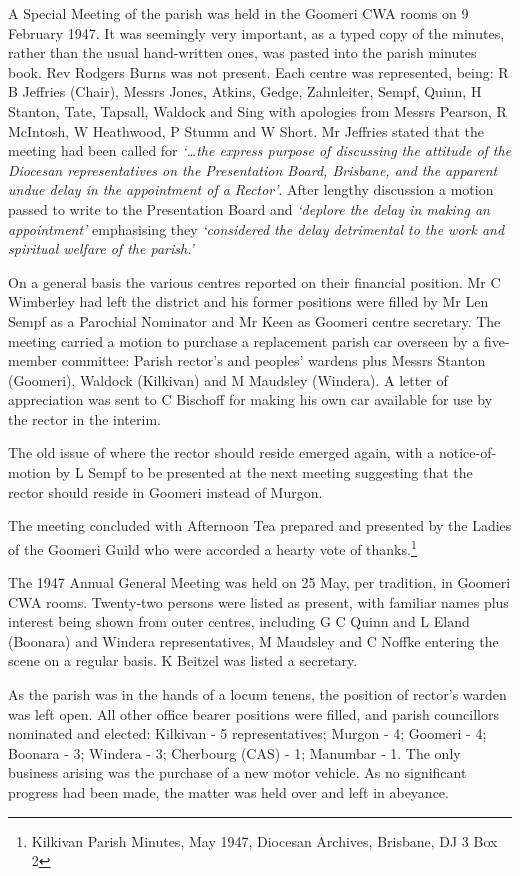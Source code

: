 A Special Meeting of the parish was held in the Goomeri CWA rooms on 9 February 1947. It was seemingly very important, as a typed copy of the minutes, rather than the usual hand-written ones, was pasted into the parish minutes book. Rev Rodgers Burns was not present. Each centre was represented, being: R B Jeffries (Chair), Messrs Jones, Atkins, Gedge, Zahnleiter, Sempf, Quinn, H Stanton, Tate, Tapsall, Waldock and Sing with apologies from Messrs Pearson, R McIntosh, W Heathwood, P Stumm and W Short. Mr Jeffries stated that the meeting had been called for \emph{`\ldots the express purpose of discussing the attitude of the Diocesan representatives on the Presentation Board, Brisbane, and the apparent undue delay in the appointment of a Rector'}. After lengthy discussion a motion passed to write to the Presentation Board and \emph{`deplore the delay in making an appointment'} emphasising they \emph{`considered the delay detrimental to the work and spiritual welfare of the parish.'}

On a general basis the various centres reported on their financial position. Mr C Wimberley had left the district and his former positions were filled by Mr Len Sempf as a Parochial Nominator and Mr Keen as Goomeri centre secretary. The meeting carried a motion to purchase a replacement parish car overseen by a five-member committee: Parish rector's and peoples' wardens plus Messrs Stanton (Goomeri), Waldock (Kilkivan) and M Maudsley (Windera). A letter of appreciation was sent to C Bischoff for making his own car available for use by the rector in the interim.

The old issue of where the rector should reside emerged again, with a notice-of-motion by L Sempf to be presented at the next meeting suggesting that the rector should reside in Goomeri instead of Murgon.

The meeting concluded with Afternoon Tea prepared and presented by the Ladies of the Goomeri Guild who were accorded a hearty vote of thanks.\footnote{Kilkivan Parish Minutes, May 1947, Diocesan Archives, Brisbane, DJ 3 Box 2}

The 1947 Annual General Meeting was held on 25 May, per tradition, in Goomeri CWA rooms. Twenty-two persons were listed as present, with familiar names plus interest being shown from outer centres, including G C Quinn and L Eland (Boonara) and Windera representatives, M Maudsley and C Noffke entering the scene on a regular basis. K Beitzel was listed a secretary.

As the parish was in the hands of a locum tenens, the position of rector's warden was left open. All other office bearer positions were filled, and parish councillors nominated and elected: Kilkivan - 5 representatives; Murgon - 4; Goomeri - 4; Boonara - 3; Windera - 3; Cherbourg (CAS) - 1; Manumbar - 1. The only business arising was the purchase of a new motor vehicle. As no significant progress had been made, the matter was held over and left in abeyance.

